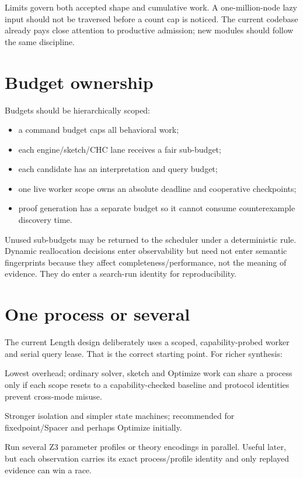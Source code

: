 \documentclass[11pt,oneside]{report}
\begin{document}
Limits govern both accepted shape and cumulative work. A one-million-node lazy input should not be traversed before a count cap is noticed. The current codebase already pays close attention to productive admission; new modules should follow the same discipline.

\section{Budget ownership}

Budgets should be hierarchically scoped:

\begin{itemize}[leftmargin=2em]
\item a command budget caps all behavioral work;
\item each engine/sketch/CHC lane receives a fair sub-budget;
\item each candidate has an interpretation and query budget;
\item one live worker scope owns an absolute deadline and cooperative checkpoints;
\item proof generation has a separate budget so it cannot consume counterexample discovery time.
\end{itemize}

Unused sub-budgets may be returned to the scheduler under a deterministic rule. Dynamic reallocation decisions enter observability but need not enter semantic fingerprints because they affect completeness/performance, not the meaning of evidence. They do enter a search-run identity for reproducibility.

\section{One process or several}

The current Length design deliberately uses a scoped, capability-probed worker and serial query lease. That is the correct starting point. For richer synthesis:

\begin{description}[leftmargin=2.2em,style=nextline]
\item[Single process, multiple protocol scopes.] Lowest overhead; ordinary solver, sketch and Optimize work can share a process only if each scope resets to a capability-checked baseline and protocol identities prevent cross-mode misuse.
\item[Separate process per protocol family.] Stronger isolation and simpler state machines; recommended for fixedpoint/Spacer and perhaps Optimize initially.
\item[Portfolio processes.] Run several Z3 parameter profiles or theory encodings in parallel. Useful later, but each observation carries its exact process/profile identity and only replayed evidence can win a race.
\end{description}
\end{document}
